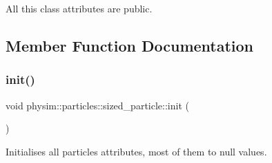 All this class\textquotesingle{} attributes are public. 

\subsection{Member Function Documentation}
\mbox{\label{classphysim_1_1particles_1_1sized__particle_a63de84961417c1522c0ca576697cd972}} 
\subsubsection{\texorpdfstring{init()}{init()}}
{\footnotesize\ttfamily void physim\+::particles\+::sized\+\_\+particle\+::init (\begin{DoxyParamCaption}{ }\end{DoxyParamCaption})\hspace{0.3cm}{\ttfamily [virtual]}}



Initialises all particle\textquotesingle{}s attributes, most of them to null values. 

